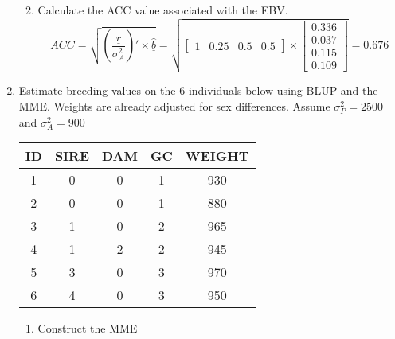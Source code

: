 \documentclass[12pt,a4paper]{paper}
\begin{document}
\begin{enumerate}
\begin{enumerate}
\begin{equation*}
\end{equation*}
\item Calculate the ACC value associated with the EBV.
\begin{equation*}
ACC = \sqrt{\left(\frac{\underline{r}}{\sigma^{2}_{A}}\right)'\times \underline{\hat{b}}} = \sqrt{\begin{bmatrix}1 & 0.25 & 0.5 & 0.5\end{bmatrix} \times \begin{bmatrix}0.336 \\ 0.037 \\ 0.115 \\ 0.109\end{bmatrix}} = 0.676
\end{equation*}
\end{enumerate}
\item Estimate breeding values on the 6 individuals below using BLUP and the MME. Weights are already adjusted for sex differences. Assume $\sigma^{2}_{P} = 2500$ and $\sigma^{2}_{A} = 900$
\begin{center}\begin{tabular}{|c||c|c|c|c|}
\hline
ID&SIRE&DAM&GC&WEIGHT\\
\hline
\hline
1&0&0&1&930\\
\hline
2&0&0&1&880\\
\hline
3&1&0&2&965\\
\hline
4&1&2&2&945\\
\hline
5&3&0&3&970\\
\hline
6&4&0&3&950\\
\hline
\end{tabular}\end{center}
\begin{enumerate}
\item Construct the MME

\end{enumerate}
\end{enumerate}
\end{document}
